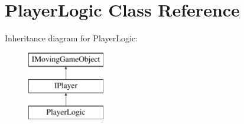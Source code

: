 \hypertarget{class_player_logic}{}\section{Player\+Logic Class Reference}
\label{class_player_logic}
Inheritance diagram for Player\+Logic\+:\begin{figure}[H]
\begin{center}
\leavevmode
\includegraphics[height=3.000000cm]{class_player_logic}
\end{center}
\end{figure}
